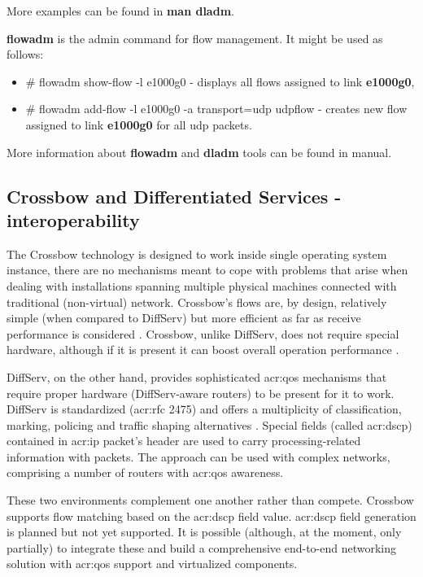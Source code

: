 \documentclass[11pt]{book}
\begin{document}
        More examples can be found in \textbf{man dladm}.

        \medskip

        \textbf{flowadm} is the admin command for flow management. It might be used as follows:     

        \begin{itemize}
          \item \# flowadm show-flow -l e1000g0 - displays all flows assigned to link \textbf{e1000g0},
          \item \# flowadm add-flow -l e1000g0 -a transport=udp udpflow - creates new flow assigned to link
                \textbf{e1000g0} for all udp packets.
        \end{itemize}

        More information about \textbf{flowadm} and \textbf{dladm} tools can be found in manual.


      \subsection{Crossbow and Differentiated Services - interoperability}
      \label{sub:sol:diffserv}

        The Crossbow technology is designed to work inside single operating system instance, there are no mechanisms
        meant to cope with problems that arise when dealing with installations spanning multiple physical machines
        connected with traditional (non-virtual) network. Crossbow's flows are, by design, relatively simple (when
        compared to DiffServ) but more efficient as far as receive performance is considered \cite{xbow-vertically}.
        Crossbow, unlike DiffServ, does not require special hardware, although if it is present it can boost overall
        operation performance \cite{xbow-vertically}.

        DiffServ, on the other hand, provides sophisticated \gls{acr:qos} mechanisms that require proper hardware
        (DiffServ-aware routers) to be present for it to work. DiffServ is standardized (\gls{acr:rfc} 2475) and offers
        a multiplicity of classification, marking, policing and traffic shaping alternatives \cite{rfc2475}. Special
        fields (called \gls{acr:dscp}) contained in \gls{acr:ip} packet's header are used to carry processing-related
        information with packets. The approach can be used with complex networks, comprising a number of routers with
        \gls{acr:qos} awareness.

        These two environments complement one another rather than compete. Crossbow supports flow matching based on the
        \gls{acr:dscp} field value. \gls{acr:dscp} field generation is planned but not yet supported. It is possible
        (although, at the moment, only partially) to integrate these and build a comprehensive end-to-end networking
        solution with \gls{acr:qos} support and virtualized components.
\end{document}
